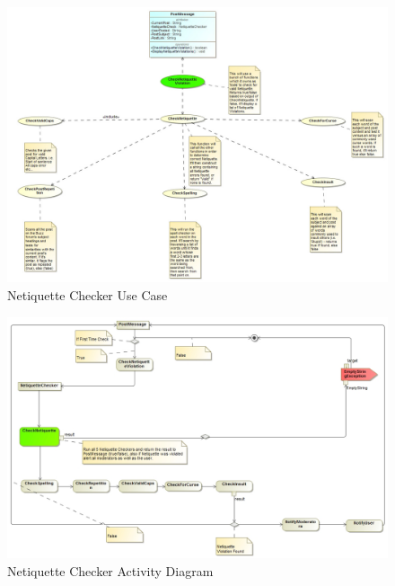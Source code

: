 \documentclass[11pt]{article}
\begin{document}
\begin{enumerate}
\begin{itemize}
\begin{figure}[H]
	  			\includegraphics[scale=0.35,center]{NetUseCase.jpg}
	  			\caption{Netiquette Checker Use Case}
	  		\end{figure}
	  		\begin{figure}[H]
	  			\includegraphics[scale=0.35,center]{NetProcessDiagram.jpg}
	  			\caption{Netiquette Checker Activity Diagram}
	  		\end{figure}
	  	\end{itemize}

\end{enumerate}
\newpage
\end{document}
